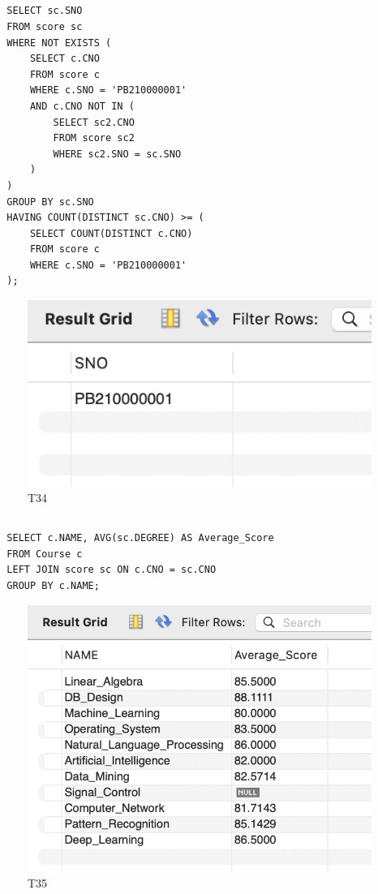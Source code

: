 \documentclass[UTF8]{ctexart}
\begin{document}
\subsection{}
\begin{lstlisting}
  SELECT sc.SNO
  FROM score sc
  WHERE NOT EXISTS (
      SELECT c.CNO
      FROM score c
      WHERE c.SNO = 'PB210000001'
      AND c.CNO NOT IN (
          SELECT sc2.CNO
          FROM score sc2
          WHERE sc2.SNO = sc.SNO
      )
  )
  GROUP BY sc.SNO
  HAVING COUNT(DISTINCT sc.CNO) >= (
      SELECT COUNT(DISTINCT c.CNO)
      FROM score c
      WHERE c.SNO = 'PB210000001'
  );   
\end{lstlisting}
\begin{figure}[H]
  \centering
  \includegraphics[scale=0.7]{pics/34.png}
  \caption*{T34}
\end{figure}

\subsection{}
\begin{lstlisting}
  SELECT c.NAME, AVG(sc.DEGREE) AS Average_Score
  FROM Course c
  LEFT JOIN score sc ON c.CNO = sc.CNO
  GROUP BY c.NAME;  
\end{lstlisting}
\begin{figure}[H]
  \centering
  \includegraphics[scale=0.7]{pics/35.png}
  \caption*{T35}
\end{figure}
\end{document}
